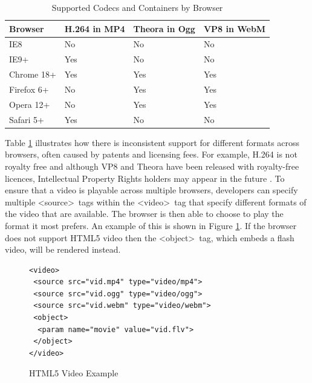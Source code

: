 \documentclass[journal]{IEEEtran}
\begin{document}
\begin{table}
	\caption{Supported Codecs and Containers by Browser \cite{inproceedings:applicationOfHTML5Multimedia}\cite{article:towardsVideoOnTheWebWithHTML5}}
	\label{tab:supportedCodecsAndContainers}
	\centering
  \begin{tabular}{|l|l|l|l|}
    \hline
    \textbf{Browser}    & \textbf{H.264 in MP4} & \textbf{Theora in Ogg} & \textbf{VP8 in WebM} \\ \hline
    IE8        & No           & No            & No          \\ \hline
    IE9+       & Yes          & No            & No          \\ \hline
    Chrome 18+ & Yes          & Yes           & Yes         \\ \hline
    Firefox 6+ & No           & Yes           & Yes         \\ \hline
    Opera 12+  & No           & Yes           & Yes         \\ \hline
    Safari 5+  & Yes          & No            & No          \\ \hline
  \end{tabular}
\end{table}

Table \ref{tab:supportedCodecsAndContainers} illustrates how there is inconsistent support for different formats across browsers, often caused by patents and licensing fees. For example, H.264 is not royalty free and although VP8 and Theora have been released with royalty-free licences, Intellectual Property Rights holders may appear in the future \cite{article:towardsVideoOnTheWebWithHTML5}\cite{website:theoraBenefits}. To ensure that a video is playable across multiple browsers, developers can specify multiple \textless source\textgreater~tags within the \textless video\textgreater~tag that specify different formats of the video that are available. The browser is then able to choose to play the format it most prefers. An example of this is shown in Figure \ref{lst:HTML5VideoExample}. If the browser does not support HTML5 video then the \textless object\textgreater~tag, which embeds a flash video, will be rendered instead.

\begin{figure}
\caption{HTML5 Video Example}
\label{lst:HTML5VideoExample}
\begin{lstlisting}[frame=single,language=HTML5]
<video>
 <source src="vid.mp4" type="video/mp4">
 <source src="vid.ogg" type="video/ogg">
 <source src="vid.webm" type="video/webm">
 <object>
  <param name="movie" value="vid.flv">
 </object>
</video>
\end{lstlisting}
\end{figure}
\end{document}
